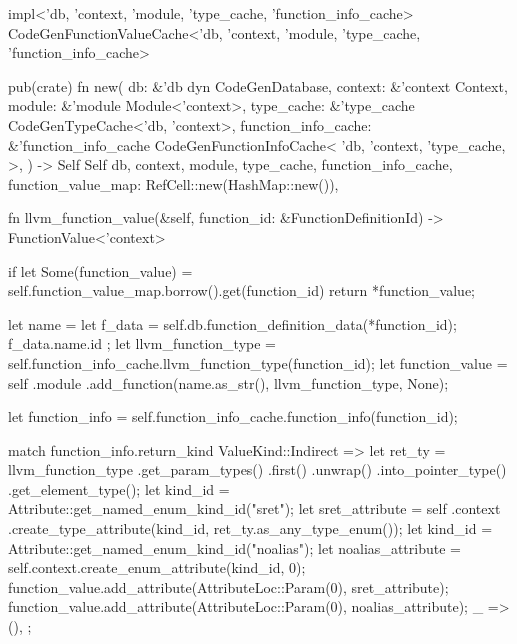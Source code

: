 \documentclass[
  oneside,
  english,
  coorientadorbanca,
  noabntexcite
]{ufsc-thesis-rn46-2019}
\begin{document}
\begin{rustcode}
impl<'db, 'context, 'module, 'type_cache, 'function_info_cache>
    CodeGenFunctionValueCache<'db, 'context, 'module, 'type_cache, 'function_info_cache>
{
    pub(crate) fn new(
        db: &'db dyn CodeGenDatabase,
        context: &'context Context,
        module: &'module Module<'context>,
        type_cache: &'type_cache CodeGenTypeCache<'db, 'context>,
        function_info_cache: &'function_info_cache CodeGenFunctionInfoCache<
            'db,
            'context,
            'type_cache,
        >,
    ) -> Self {
        Self {
            db,
            context,
            module,
            type_cache,
            function_info_cache,
            function_value_map: RefCell::new(HashMap::new()),
        }
    }

    fn llvm_function_value(&self, function_id: &FunctionDefinitionId) -> FunctionValue<'context> {
        if let Some(function_value) = self.function_value_map.borrow().get(function_id) {
            return *function_value;
        }

        let name = {
            let f_data = self.db.function_definition_data(*function_id);
            f_data.name.id
        };
        let llvm_function_type = self.function_info_cache.llvm_function_type(function_id);
        let function_value = self
            .module
            .add_function(name.as_str(), llvm_function_type, None);

        let function_info = self.function_info_cache.function_info(function_id);

        match function_info.return_kind {
            ValueKind::Indirect => {
                let ret_ty = llvm_function_type
                    .get_param_types()
                    .first()
                    .unwrap()
                    .into_pointer_type()
                    .get_element_type();
                let kind_id = Attribute::get_named_enum_kind_id("sret");
                let sret_attribute = self
                    .context
                    .create_type_attribute(kind_id, ret_ty.as_any_type_enum());
                let kind_id = Attribute::get_named_enum_kind_id("noalias");
                let noalias_attribute = self.context.create_enum_attribute(kind_id, 0);
                function_value.add_attribute(AttributeLoc::Param(0), sret_attribute);
                function_value.add_attribute(AttributeLoc::Param(0), noalias_attribute);
            }
            _ => (),
        };

}}
\end{rustcode}
\end{document}
